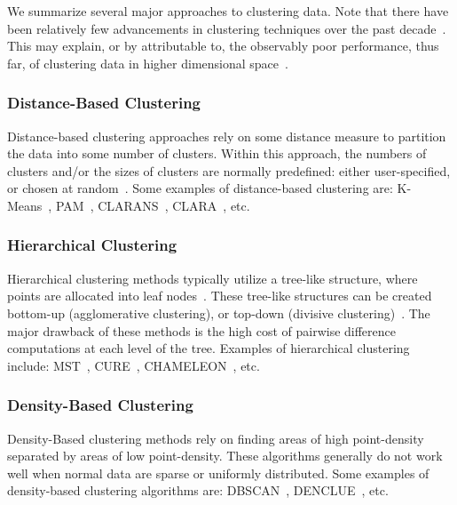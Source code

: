 We summarize several major approaches to clustering data.
Note that there have been relatively few advancements in clustering techniques over the past decade~\cite{wang_progress_2019}. This may explain, or by attributable to, the observably poor performance, thus far, of clustering data in higher dimensional space~\cite{zhang_advancements_2013}.

\subsubsection{Distance-Based Clustering}

Distance-based clustering approaches rely on some distance measure to partition the data into some number of clusters.
Within this approach, the numbers of clusters and/or the sizes of clusters are normally predefined: either user-specified, or chosen at random~\cite{wang_progress_2019}.
Some examples of distance-based clustering are: 
K-Means~\cite{macqueen_methods_nodate}, 
PAM~\cite{kaufman_finding_nodate}, 
CLARANS~\cite{ng_efficient_nodate}, 
CLARA~\cite{kaufman_finding_nodate}, 
etc.

\subsubsection{Hierarchical Clustering}

Hierarchical clustering methods typically utilize a tree-like structure, where points are allocated into leaf nodes~\cite{wang_progress_2019}.
These tree-like structures can be created bottom-up (agglomerative clustering), or top-down (divisive clustering)~\cite{rakesh_agrawal_automatic_1998}.
The major drawback of these methods is the high cost of pairwise difference computations at each level of the tree.
Examples of hierarchical clustering include: 
MST~\cite{charles_zahn_graph_1971}, 
CURE~\cite{noauthor_cure:_nodate}, 
CHAMELEON~\cite{karypis_chameleon:_nodate}, 
etc.

\subsubsection{Density-Based Clustering}

Density-Based clustering methods rely on finding areas of high point-density separated by areas of low point-density.
These algorithms generally do not work well when normal data are sparse or uniformly distributed.
Some examples of density-based clustering algorithms are: 
DBSCAN~\cite{ester_density-based_nodate}, 
DENCLUE~\cite{Hinneburg1998Effic-5816}, 
etc.

